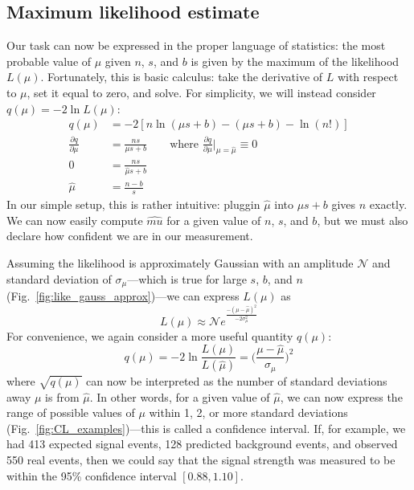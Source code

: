 \subsection{Maximum likelihood estimate}
Our task can now be expressed in the proper language of statistics: the most probable value of $\mu$ given $n$, $s$, and $b$ is given by the maximum of the likelihood $L(\mu)$. 
Fortunately, this is basic calculus: take the derivative of $L$ with respect to $\mu$, set it equal to zero, and solve. 
For simplicity, we will instead consider $q(\mu) = -2\ln{L(\mu)}$:
\begin{align}
    q(\mu) &= -2[n\ln(\mu s + b) - (\mu s + b) - \ln{(n!)}] \\
    \frac{\partial q}{\partial \mu} &= \frac{ns}{\mu s + b}\qquad\text{where }\frac{\partial q}{\partial \mu}\bigg|_{\mu=\hat{\mu}} \equiv 0 \\
    0 &= \frac{ns}{\hat{\mu} s + b} \\
    \hat{\mu} &= \frac{n - b}{s}
\end{align}
In our simple setup, this is rather intuitive: pluggin $\hat{\mu}$ into $\mu s + b$ gives $n$ exactly. 
We can now easily compute $\hat{mu}$ for a given value of $n$, $s$, and $b$, but we must also declare how confident we are in our measurement.

Assuming the likelihood is approximately Gaussian\footnotemark{} with an amplitude $\mathcal{N}$ and standard deviation of $\sigma_\mu$---which is true for large $s$, $b$, and $n$ (Fig.~\ref{fig:like_gauss_approx})---we can express $L(\mu)$ as
\begin{equation}
    L(\mu) \approx \mathcal{N}e^{\frac{-(\mu - \hat{\mu})^2}{-2\sigma^2_\mu}}
\end{equation}
For convenience, we again consider a more useful quantity $q(\mu)$:
\begin{equation}
    q(\mu) = -2\ln\frac{L(\mu)}{L(\hat{\mu})} = \bigg(\frac{\mu - \hat{\mu}}{\sigma_\mu}\bigg)^2
\end{equation}
where $\sqrt{q(\mu)}$ can now be interpreted as the number of standard deviations away $\mu$ is from $\hat{\mu}$. 
In other words, for a given value of $\hat{\mu}$, we can now express the range of possible values of $\mu$ within 1, 2, or more standard deviations (Fig.~\ref{fig:CL_examples})---this is called a confidence interval. 
If, for example, we had 413 expected signal events, 128 predicted background events, and observed 550 real events, then we could say that the signal strength was measured to be within the 95\% confidence interval $[0.88, 1.10]$. 

